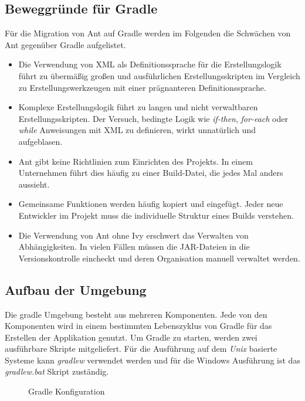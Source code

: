 \subsection{Beweggründe für Gradle}
Für die Migration von Ant auf Gradle werden im Folgenden die Schwächen von Ant gegenüber Gradle aufgelistet.
\begin{itemize}
  \item Die Verwendung von XML als Definitionssprache für die Erstellungslogik führt zu übermäßig großen und ausführlichen Erstellungsskripten im Vergleich zu Erstellungswerkzeugen mit einer prägnanteren Definitionssprache. \cite{muschko2014gradle}
  \item Komplexe Erstellungslogik führt zu langen und nicht verwaltbaren Erstellungsskripten. Der Versuch, bedingte Logik wie \textit{if-then}, \textit{for-each} oder \textit{while} Anweisungen mit XML zu definieren, wirkt unnatürlich und aufgeblasen.\cite{muschko2014gradle}
  \item Ant gibt keine Richtlinien zum Einrichten des Projekts. In einem Unternehmen führt dies häufig zu einer Build-Datei, die jedes Mal anders aussieht.\cite{berglund2011building}
  \item Gemeinsame Funktionen werden häufig kopiert und eingefügt. Jeder neue Entwickler im Projekt muss die individuelle Struktur eines Builds verstehen.\cite{varanasi2015introducing}
  \item Die Verwendung von Ant ohne Ivy erschwert das Verwalten von Abhängigkeiten. In vielen Fällen müssen die JAR-Dateien in die Versionskontrolle eincheckt und deren Organisation manuell verwaltet werden.\cite{varanasi2015introducing}
\end{itemize}

\subsection{Aufbau der Umgebung}
  Die gradle Umgebung besteht aus mehreren Komponenten. Jede von den Komponenten wird in einem bestimmten Lebenszyklus von Gradle für das Erstellen der Applikation genutzt.\newline
  Um Gradle zu starten, werden zwei ausführbare Skripte mitgeliefert. Für die Ausführung auf dem \textit{Unix} basierte Systeme kann \textit{gradlew} verwendet werden und für die Windows Ausführung ist das \textit{gradlew.bat} Skript zuständig.\bigbreak
  \begin{figure}[h!]
    \centering
    \begin{minipage}{7cm}
    \end{minipage}
    \caption{Gradle Konfiguration \cite{gradleStructure}}
    \label{fig:gradle_project_structure}
  \end{figure}

